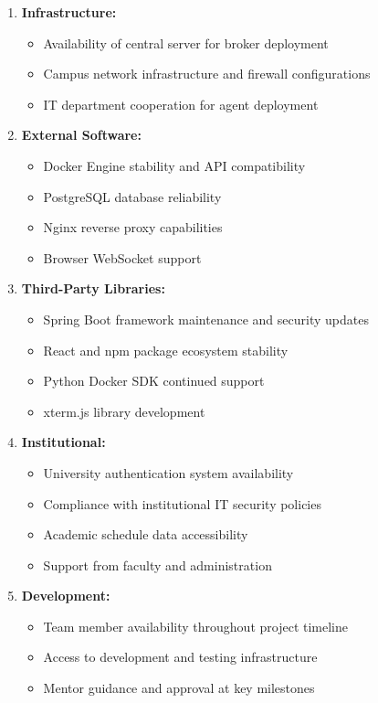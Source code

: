 \documentclass[12pt,a4paper]{article}
\begin{document}
\begin{enumerate}
    \item \textbf{Infrastructure:}
    \begin{itemize}
        \item Availability of central server for broker deployment
        \item Campus network infrastructure and firewall configurations
        \item IT department cooperation for agent deployment
    \end{itemize}
    
    \item \textbf{External Software:}
    \begin{itemize}
        \item Docker Engine stability and API compatibility
        \item PostgreSQL database reliability
        \item Nginx reverse proxy capabilities
        \item Browser WebSocket support
    \end{itemize}
    
    \item \textbf{Third-Party Libraries:}
    \begin{itemize}
        \item Spring Boot framework maintenance and security updates
        \item React and npm package ecosystem stability
        \item Python Docker SDK continued support
        \item xterm.js library development
    \end{itemize}
    
    \item \textbf{Institutional:}
    \begin{itemize}
        \item University authentication system availability
        \item Compliance with institutional IT security policies
        \item Academic schedule data accessibility
        \item Support from faculty and administration
    \end{itemize}
    
    \item \textbf{Development:}
    \begin{itemize}
        \item Team member availability throughout project timeline
        \item Access to development and testing infrastructure
        \item Mentor guidance and approval at key milestones
    \end{itemize}
\end{enumerate}
\end{document}
